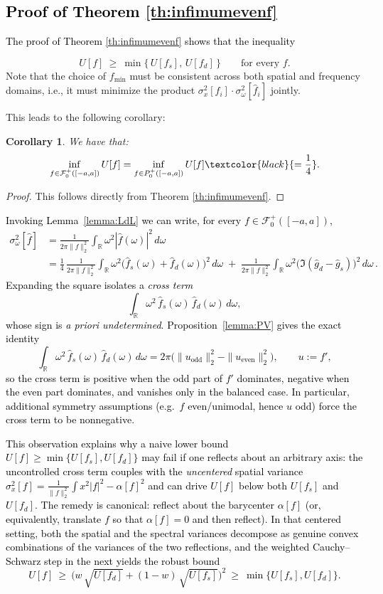 \documentclass[preprint,hidelinks,authoryear]{elsarticle}
\newtheorem{Cor}[Thm]{Corollary}
\theoremstyle{plain}
\theoremstyle{definition}
\theoremstyle{remark}
\begin{document}
\textcolor{black}{\subsection{Proof of Theorem \ref{th:infimumevenf}}
The proof of Theorem \ref{th:infimumevenf} shows that the inequality}
$$
U[f]\ \ge\ \min\{\,U[f_s],\,U[f_d]\,\}\qquad\text{for every }f.
$$
Note that the choice of $f_{\min}$ must be consistent across both spatial and frequency domains, i.e., it must minimize the product $\sigma_x^2[f_i] \cdot \sigma_\omega^2[\hat{f}_i]$ jointly.



This leads to the following corollary:
\begin{Cor}
    We have that:
    $$
\inf_{\substack{f \in \mathcal{F}_0^+([-a,a])}} U[f] = \inf_{\substack{f \in P_0^+([-a,a])}} U[f]
 \textcolor{black}{ =\frac{1}{4}}.$$
\end{Cor}
\begin{proof}
    This follows directly from Theorem \ref{th:infimumevenf}.
\end{proof}

\textcolor{black}{
Invoking Lemma~\ref{lemma:LdL} we can write, for every $f\in\mathcal F_0^+([-a,a])$,
\begin{align*}
\sigma_\omega^2[\hat f]
&=\frac{1}{2\pi\|f\|_2^2}\int_{\mathbb R}\omega^2|\hat f(\omega)|^2\,d\omega\\
&=\frac{1}{4}\,\frac{1}{2\pi\|f\|_2^2}\int_{\mathbb R}\omega^2\Big(
\hat f_s(\omega)+\hat f_d(\omega)\Big)^2\,d\omega
\;+\;\frac{1}{2\pi\|f\|_2^2}\int_{\mathbb R}\omega^2\Big(\Im(\hat g_d-\hat g_s)\Big)^2\,d\omega\, .
\end{align*}
Expanding the square isolates a \emph{cross term}
$$
\int_{\mathbb R}\omega^2\,\hat f_s(\omega)\,\hat f_d(\omega)\,d\omega,
$$
whose sign is \emph{a priori undetermined}. Proposition~\ref{lemma:PV} gives the exact identity
$$
\int_{\mathbb R}\omega^2\,\hat f_s(\omega)\,\hat f_d(\omega)\,d\omega
=2\pi\Big(\|u_{\mathrm{odd}}\|_2^2-\|u_{\mathrm{even}}\|_2^2\Big),
\qquad u:=f',
$$
so the cross term is positive when the odd part of $f'$ dominates, negative when the even part
dominates, and vanishes only in the balanced case. In particular, additional symmetry assumptions
(e.g.\ $f$ even/unimodal, hence $u$ odd) force the cross term to be nonnegative.}

\textcolor{black}{This observation explains why a naive lower bound
$U[f]\ge \min\{U[f_s],U[f_d]\}$ may fail if one reflects about an arbitrary axis:
the uncontrolled cross term couples with the \emph{uncentered} spatial variance
$\sigma_x^2[f]=\tfrac{1}{\|f\|_2^2}\int x^2|f|^2-\alpha[f]^2$ and can drive $U[f]$ below both
$U[f_s]$ and $U[f_d]$. The remedy is canonical: reflect about the barycenter $\alpha[f]$
(or, equivalently, translate $f$ so that $\alpha[f]=0$ and then reflect). In that centered
setting, both the spatial and the spectral variances decompose as genuine convex combinations
of the variances of the two reflections, and the weighted Cauchy–Schwarz step in the
next yields the robust bound
$$
U[f]\ \ge\ \Big(w\,\sqrt{U[f_d]}+(1-w)\,\sqrt{U[f_s]}\Big)^2\ \ge\ \min\{U[f_s],U[f_d]\}.
$$
}
\end{document}
